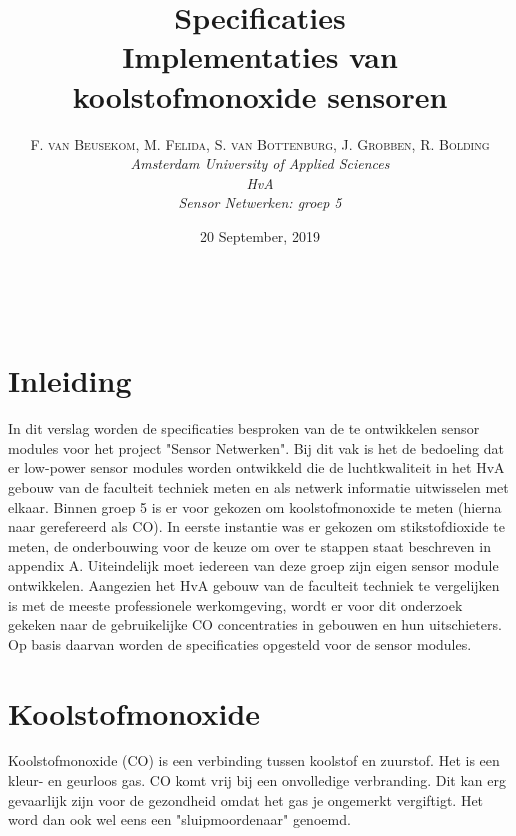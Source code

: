 \documentclass[a4paper, 11pt]{article} %
\title{\textbf{Specificaties}\\ %
Implementaties van koolstofmonoxide sensoren} %
\author{\textsc{F. van Beusekom, M. Felida, S. van Bottenburg, J. Grobben, R. Bolding} %
\\{\textit{Amsterdam University of Applied Sciences\\ 
HvA\\
Sensor Netwerken: groep 5}}} %
\date{20 September, 2019} %
\makeatletter
\renewcommand{\maketitle}{ %
\begin{flushright} %
{\LARGE\@title} %

\vspace{50pt} %

{\large\@author} %
\\\@date %

\vspace{40pt} %
\end{flushright}
}
\makeatother
\begin{document}
\captionsetup{justification=centering}
\hypersetup{hidelinks=true}
\maketitle %




\vspace{10pt} %

\newpage
\section{Inleiding}
In dit verslag worden de specificaties besproken van de te ontwikkelen sensor modules voor het project "Sensor Netwerken". Bij dit vak is het de bedoeling dat er low-power sensor modules worden ontwikkeld die de luchtkwaliteit in het HvA gebouw van de faculteit techniek meten en als netwerk informatie uitwisselen met elkaar. Binnen groep 5 is er voor gekozen om koolstofmonoxide te meten (hierna naar gerefereerd als CO). In eerste instantie was er gekozen om stikstofdioxide te meten, de onderbouwing voor de keuze om over te stappen staat beschreven in appendix A. Uiteindelijk moet iedereen van deze groep zijn eigen sensor module ontwikkelen. Aangezien het HvA gebouw van de faculteit techniek te vergelijken is met de meeste professionele werkomgeving, wordt er voor dit onderzoek gekeken naar de gebruikelijke CO concentraties in gebouwen en hun uitschieters. Op basis daarvan worden de specificaties opgesteld voor de sensor modules.

\section{Koolstofmonoxide}
Koolstofmonoxide (CO) is een verbinding tussen koolstof en zuurstof. Het is een kleur- en geurloos gas. CO komt vrij bij een onvolledige verbranding. Dit kan erg gevaarlijk zijn voor de gezondheid omdat het gas je ongemerkt vergiftigt. Het word dan ook wel eens een "sluipmoordenaar" genoemd. 
\end{document}
